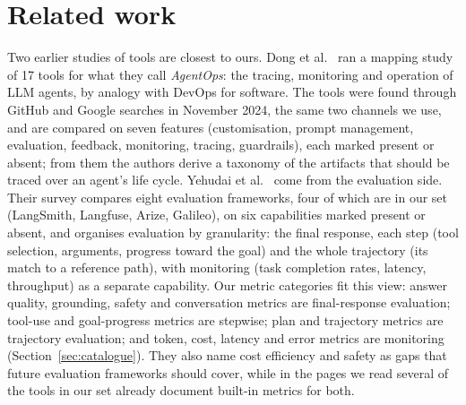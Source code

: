 \documentclass[conference]{IEEEtran}
\begin{document}
\section{Related work}\label{sec:prior}
Two earlier studies of tools are closest to ours. Dong et al.~\cite{dong2024agentops} ran a mapping study of 17 tools for what they call \emph{AgentOps}: the tracing, monitoring and operation of LLM agents, by analogy with DevOps for software. The tools were found through GitHub and Google searches in November 2024, the same two channels we use, and are compared on seven features (customisation, prompt management, evaluation, feedback, monitoring, tracing, guardrails), each marked present or absent; from them the authors derive a taxonomy of the artifacts that should be traced over an agent's life cycle. Yehudai et al.~\cite{yehudai2025survey} come from the evaluation side. Their survey compares eight evaluation frameworks, four of which are in our set (LangSmith, Langfuse, Arize, Galileo), on six capabilities marked present or absent, and organises evaluation by granularity: the final response, each step (tool selection, arguments, progress toward the goal) and the whole trajectory (its match to a reference path), with monitoring (task completion rates, latency, throughput) as a separate capability. Our metric categories fit this view: answer quality, grounding, safety and conversation metrics are final-response evaluation; tool-use and goal-progress metrics are stepwise; plan and trajectory metrics are trajectory evaluation; and token, cost, latency and error metrics are monitoring (Section~\ref{sec:catalogue}). They also name cost efficiency and safety as gaps that future evaluation frameworks should cover, while in the pages we read several of the tools in our set already document built-in metrics for both.
\end{document}
